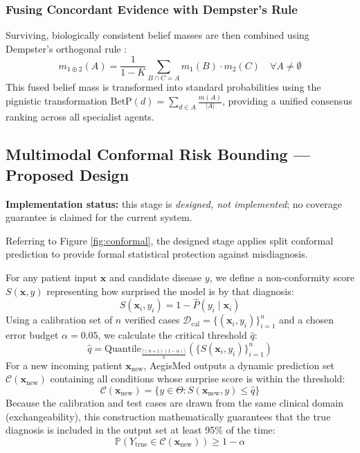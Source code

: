 \documentclass[10pt,twocolumn]{article}
\begin{document}
\subsubsection{Fusing Concordant Evidence with Dempster's Rule}
Surviving, biologically consistent belief masses are then combined using Dempster's orthogonal rule \cite{dempster1967upper}:
\begin{equation}
m_{1 \oplus 2}(A) = \frac{1}{1 - K} \sum_{B \cap C = A} m_1(B) \cdot m_2(C) \quad \forall A \neq \emptyset
\end{equation}
This fused belief mass is transformed into standard probabilities using the pignistic transformation $\text{BetP}(d) = \sum_{d \in A} \frac{m(A)}{|A|}$, providing a unified consensus ranking across all specialist agents.

\subsection{Multimodal Conformal Risk Bounding --- Proposed Design}
\textbf{Implementation status:} this stage is \emph{designed, not implemented}; no coverage guarantee is claimed for the current system.

Referring to Figure \ref{fig:conformal}, the designed stage applies split conformal prediction \cite{vovk2005algorithmic, angelopoulos2021gentle} to provide formal statistical protection against misdiagnosis.

For any patient input $\mathbf{x}$ and candidate disease $y$, we define a non-conformity score $S(\mathbf{x}, y)$ representing how surprised the model is by that diagnosis:
\begin{equation}
S(\mathbf{x}_i, y_i) = 1 - \hat{P}(y_i \mid \mathbf{x}_i)
\end{equation}
Using a calibration set of $n$ verified cases $\mathcal{D}_{\text{cal}} = \{(\mathbf{x}_i, y_i)\}_{i=1}^n$ and a chosen error budget $\alpha = 0.05$, we calculate the critical threshold $\hat{q}$:
\begin{equation}
\hat{q} = \text{Quantile}_{\frac{\lceil (n + 1)(1 - \alpha) \rceil}{n}}\left( \{S(\mathbf{x}_i, y_i)\}_{i=1}^n \right)
\end{equation}
For a new incoming patient $\mathbf{x}_{\text{new}}$, AegisMed outputs a dynamic prediction set $\mathcal{C}(\mathbf{x}_{\text{new}})$ containing all conditions whose surprise score is within the threshold:
\begin{equation}
\mathcal{C}(\mathbf{x}_{\text{new}}) = \{y \in \Theta : S(\mathbf{x}_{\text{new}}, y) \le \hat{q}\}
\end{equation}
Because the calibration and test cases are drawn from the same clinical domain (exchangeability), this construction mathematically guarantees that the true diagnosis is included in the output set at least 95\% of the time:
\begin{equation}
\mathbb{P}\left(Y_{\text{true}} \in \mathcal{C}(\mathbf{x}_{\text{new}})\right) \ge 1 - \alpha
\end{equation}
\end{document}
